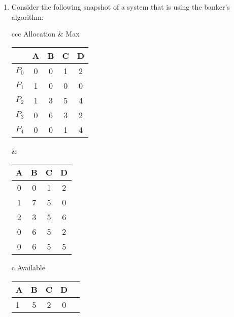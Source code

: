 \documentclass{article}
\newcommand{\answercolor}{Bittersweet}
\newcommand{\answer}[1]{\\\textcolor{\answercolor}{#1}}
\newcommand{\answerimg}[1]{\answer{\begin{figure*}[h]\centering\texttt{[image: \#1]}\end{figure*}}}
\begin{document}
\begin{enumerate}
		\begin{enumerate}
			\item Draw resource-allocation graph for the system
			\answerimg{T5Q5a.jpg}
			\item Draw the corresponding wait-for graph
			\answerimg{T5Q5b.jpg}
			\item Is this system deadlocked?
			\answer{Yes, the system is deadlocked.}
			\item If so, which processes are involved?
			\answer{The processes involved are \textit{D,E,G}}
		\end{enumerate}
		\item Consider the following snapshot of a system that is using the banker’s algorithm:
		\begin{table*}[h]
			\centering
			\begin{tabular}{ccc}
				Allocation & Max \\
				\begin{tabular}{lcccc}
					& A & B & C & D \\\hline
					$P_0$ & 0 & 0 & 1 & 2 \\
					$P_1$ & 1 & 0 & 0 & 0 \\
					$P_2$ & 1 & 3 & 5 & 4 \\
					$P_3$ & 0 & 6 & 3 & 2 \\
					$P_4$ & 0 & 0 & 1 & 4 \\
				\end{tabular}
				&
				\begin{tabular}{cccc}
					A & B & C & D \\\hline
					0 & 0 & 1 & 2 \\
					1 & 7 & 5 & 0 \\
					2 & 3 & 5 & 6 \\
					0 & 6 & 5 & 2 \\
					0 & 6 & 5 & 5 \\
				\end{tabular}
			\end{tabular}
		\end{table*}
		\begin{table*}[h]
			\centering
			\begin{tabular}{c}
				Available                     \\
				\begin{tabular}{lcccc}
					A & B & C & D \\\hline
					1 & 5 & 2 & 0 \\
				\end{tabular}
			\end{tabular}

\end{table*}
\end{enumerate}
\end{document}
